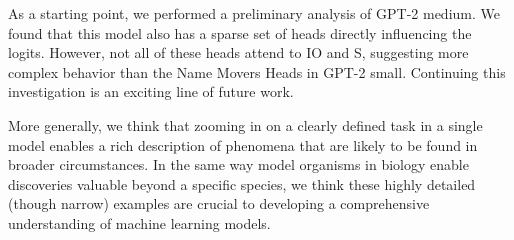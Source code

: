 As a starting point, we performed a preliminary analysis of GPT-2 medium. We found that this model also has a sparse set of heads directly influencing the logits. However, not all of these heads attend to IO and S, suggesting more complex behavior than the Name Movers Heads in GPT-2 small. 
Continuing this investigation is an exciting line of future work. 

More generally, we think that zooming in on a clearly defined task in a single model enables a rich description of phenomena that are likely to be found in broader circumstances. In the same way model organisms in biology enable discoveries valuable beyond a specific species, we think these highly detailed (though narrow) examples are crucial to developing a comprehensive understanding of machine learning models.










